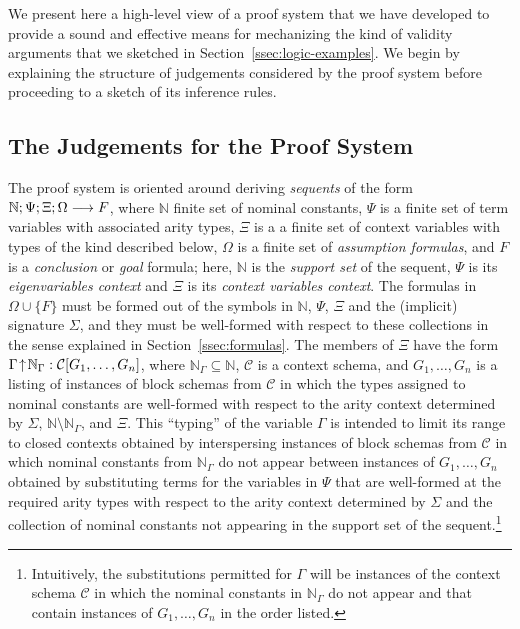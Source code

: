 We present here a high-level view of a proof system that we have developed
to provide a sound and effective means for mechanizing the kind of
validity arguments that we sketched in Section~\ref{ssec:logic-examples}.
%
We begin by explaining the structure of judgements considered by the
proof system before proceeding to a sketch of its inference rules.

\subsection{The Judgements for the Proof System}\label{ssec:sequents}

The proof system is oriented around deriving \emph{sequents} of the
form $\mathbb{N};\Psi;\Xi;\Omega\longrightarrow F$, where $\mathbb{N}$
finite set of nominal constants, $\Psi$ is a finite set of term
variables with associated arity types, $\Xi$ is a a finite set of
context variables with types of the kind described below, 
$\Omega$ is a finite set of \emph{assumption formulas}, and $F$ is a
\emph{conclusion} or \emph{goal} formula; 
here, $\mathbb{N}$ is the \emph{support set} of the
sequent, $\Psi$ is its \emph{eigenvariables context} and $\Xi$ is its
\emph{context variables context}.
%
The formulas in $\Omega \cup \{F\}$ must be formed out of the symbols
in $\mathbb{N}$, $\Psi$, $\Xi$ and the (implicit) signature $\Sigma$,
and they must be well-formed with respect to these collections in the
sense explained in Section~\ref{ssec:formulas}. 
%
The members of $\Xi$ have the form
$\Gamma\!\uparrow\!\mathbb{N}_{\Gamma} : \mathcal{C}\lbrack {G_1,\ldots,G_n}\rbrack$,
where $\mathbb{N}_{\Gamma} \subseteq \mathbb{N}$,
$\mathcal{C}$ is a context schema, and $G_1,\ldots,G_n$ is a listing of
instances of block schemas from $\mathcal{C}$ in which the types assigned to
nominal constants are well-formed with respect to the arity context
determined by $\Sigma$, $\mathbb{N} \setminus \mathbb{N}_\Gamma$, and $\Xi$. 
%
This ``typing'' of the variable $\Gamma$ is intended to limit its
range to closed contexts obtained by interspersing instances of block
schemas from $\mathcal{C}$ in which nominal constants from
$\mathbb{N}_\Gamma$ do not appear between instances of
$G_1,\ldots,G_n$ obtained by substituting terms for the variables in
$\Psi$ that are well-formed at the required arity types with respect
to the arity context determined by $\Sigma$ and the collection of
nominal constants not appearing in the support set of the
sequent.\footnote{Intuitively, the substitutions permitted for
  $\Gamma$ will be instances of the context schema $\mathcal{C}$ in
  which the nominal constants in $\mathbb{N}_\Gamma$ do not appear and
  that contain instances of $G_1,\ldots,G_n$ in the order listed.}

